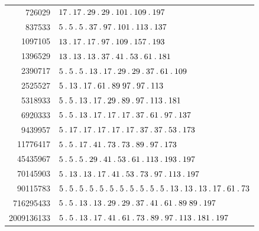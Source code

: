 \begin{longtable}{@{}r|l@{}}
726029 & $17\pdot 17\pdot 29\pdot 29\pdot 101\pdot 109\pdot 197$\\
837533 & $5\pdot 5\pdot 5\pdot 37\pdot 97\pdot 101\pdot 113\pdot 137$\\
1097105 & $13\pdot 17\pdot 17\pdot 97\pdot 109\pdot 157\pdot 193$\\
1396529 & $13\pdot 13\pdot 13\pdot 37\pdot 41\pdot 53\pdot 61\pdot 181$\\
2390717 & $5\pdot 5\pdot 5\pdot 13\pdot 17\pdot 29\pdot 29\pdot 37\pdot 61\pdot 109$\\
2525527 & $5\pdot 13\pdot 17\pdot 61\pdot 89\;97\pdot 97\pdot 113$\\
5318933 & $5\pdot 5\pdot 13\pdot 17\pdot 29\pdot 89\pdot 97\pdot 113\pdot 181$\\
6920333 & $5\pdot 5\pdot 13\pdot 17\pdot 17\pdot 17\pdot 37\pdot 61\pdot 97\pdot 137$\\
9439957 & $5\pdot 17\pdot 17\pdot 17\pdot 17\pdot 17\pdot 37\pdot 37\pdot 53\pdot 173$\\
11776417 & $5\pdot 5\pdot 17\pdot 41\pdot 73\pdot 73\pdot 89\pdot 97\pdot 173$\\
45435967 & $5\pdot 5\pdot 5\pdot 29\pdot 41\pdot 53\pdot 61\pdot 113\pdot 193\pdot 197$\\
70145903 & $5\pdot 13\pdot 13\pdot 17\pdot 41\pdot 53\pdot 73\pdot 97\pdot 113\pdot 197$\\
90115783 & $5\pdot 5\pdot 5\pdot 5\pdot 5\pdot 5\pdot 5\pdot 5\pdot 5\pdot 5\pdot 5\pdot 13\pdot 13\pdot 13\pdot 17\pdot 61\pdot 73$\\
716295433 & $5\pdot 5\pdot 13\pdot 13\pdot 29\pdot 29\pdot 37\pdot 41\pdot 61\pdot 89\;89\pdot 197$\\
2009136133 & $5\pdot 5\pdot 13\pdot 17\pdot 41\pdot 61\pdot 73\pdot 89\pdot 97\pdot 113\pdot 181\pdot 197$\\
\end{longtable}\endgroup
\par\medskip\begingroup\small\setlength{\tabcolsep}{5pt}

